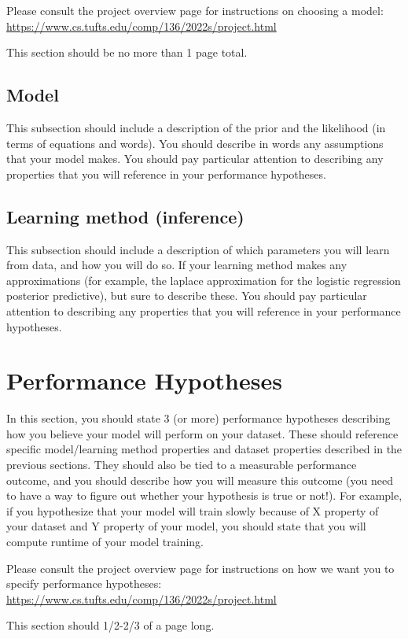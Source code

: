 \documentclass[12pt]{article}
\begin{document}
Please consult the project overview page for instructions on choosing a model: \url{https://www.cs.tufts.edu/comp/136/2022s/project.html}

This section should be no more than 1 page total.  

\subsection{Model}

This subsection should include a description of the prior and the likelihood (in terms of equations and words).  You should describe in words any assumptions that your model makes.  You should pay particular attention to describing any properties that you will reference in your performance hypotheses.

\subsection{Learning method (inference)}

This subsection should include a description of which parameters you will learn from data, and how you will do so.  If your learning method makes any approximations (for example, the laplace approximation for the logistic regression posterior predictive), but sure to describe these.  You should pay particular attention to describing any properties that you will reference in your performance hypotheses.

\section{Performance Hypotheses}

In this section, you should state 3 (or more) performance hypotheses describing how you believe your model will perform on your dataset.  These should reference specific model/learning method properties and dataset properties described in the previous sections.  They should also be tied to a measurable performance outcome, and you should describe how you will measure this outcome (you need to have a way to figure out whether your hypothesis is true or not!).  For example, if you hypothesize that your model will train slowly because of X property of your dataset and Y property of your model, you should state that you will compute runtime of your model training.  

Please consult the project overview page for instructions on how we want you to specify performance hypotheses: \url{https://www.cs.tufts.edu/comp/136/2022s/project.html}

This section should 1/2-2/3 of a page long.
\end{document}
